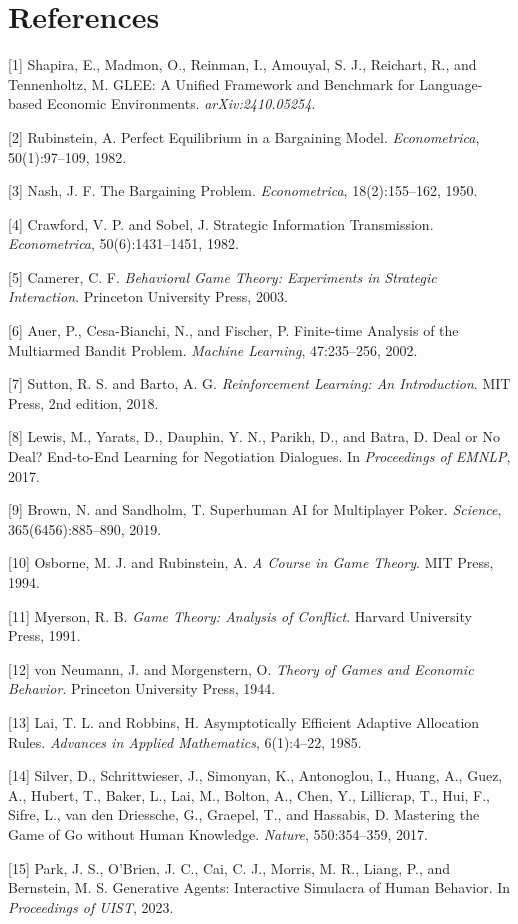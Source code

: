 \documentclass{article}
\begin{document}
\section*{References}
\small

[1] Shapira, E., Madmon, O., Reinman, I., Amouyal, S. J., Reichart, R., and Tennenholtz, M. GLEE: A Unified Framework and Benchmark for Language-based Economic Environments. \emph{arXiv:2410.05254}.

[2] Rubinstein, A. Perfect Equilibrium in a Bargaining Model. \emph{Econometrica}, 50(1):97--109, 1982.

[3] Nash, J. F. The Bargaining Problem. \emph{Econometrica}, 18(2):155--162, 1950.

[4] Crawford, V. P. and Sobel, J. Strategic Information Transmission. \emph{Econometrica}, 50(6):1431--1451, 1982.

[5] Camerer, C. F. \emph{Behavioral Game Theory: Experiments in Strategic Interaction}. Princeton University Press, 2003.

[6] Auer, P., Cesa-Bianchi, N., and Fischer, P. Finite-time Analysis of the Multiarmed Bandit Problem. \emph{Machine Learning}, 47:235--256, 2002.

[7] Sutton, R. S. and Barto, A. G. \emph{Reinforcement Learning: An Introduction}. MIT Press, 2nd edition, 2018.

[8] Lewis, M., Yarats, D., Dauphin, Y. N., Parikh, D., and Batra, D. Deal or No Deal? End-to-End Learning for Negotiation Dialogues. In \emph{Proceedings of EMNLP}, 2017.

[9] Brown, N. and Sandholm, T. Superhuman AI for Multiplayer Poker. \emph{Science}, 365(6456):885--890, 2019.

[10] Osborne, M. J. and Rubinstein, A. \emph{A Course in Game Theory}. MIT Press, 1994.

[11] Myerson, R. B. \emph{Game Theory: Analysis of Conflict}. Harvard University Press, 1991.

[12] von Neumann, J. and Morgenstern, O. \emph{Theory of Games and Economic Behavior}. Princeton University Press, 1944.

[13] Lai, T. L. and Robbins, H. Asymptotically Efficient Adaptive Allocation Rules. \emph{Advances in Applied Mathematics}, 6(1):4--22, 1985.

[14] Silver, D., Schrittwieser, J., Simonyan, K., Antonoglou, I., Huang, A., Guez, A., Hubert, T., Baker, L., Lai, M., Bolton, A., Chen, Y., Lillicrap, T., Hui, F., Sifre, L., van den Driessche, G., Graepel, T., and Hassabis, D. Mastering the Game of Go without Human Knowledge. \emph{Nature}, 550:354--359, 2017.

[15] Park, J. S., O'Brien, J. C., Cai, C. J., Morris, M. R., Liang, P., and Bernstein, M. S. Generative Agents: Interactive Simulacra of Human Behavior. In \emph{Proceedings of UIST}, 2023.
\end{document}
